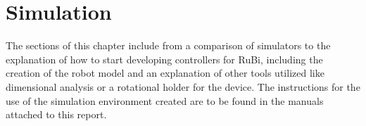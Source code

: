 \chapter{Simulation} %
\label{cha:simulation}
The sections of this chapter include from a comparison of simulators to the explanation of how to start developing controllers for RuBi, including the creation of the robot model and an explanation of other tools utilized like dimensional analysis or a rotational holder for the device.
The instructions for the use of the simulation environment created are to be found in the manuals attached to this report.







